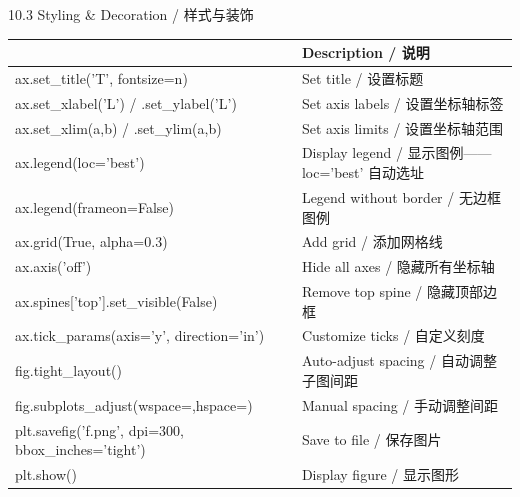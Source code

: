 \documentclass[11pt,a4paper]{report}
\begin{document}
\begin{cmdsection}{10.3  Styling \& Decoration / 样式与装饰}
\normalsize\renewcommand{\arraystretch}{1.4}
\centering
\begin{tabularx}{\textwidth}{@{}>{\ttfamily}l>{\raggedright\arraybackslash}X@{}}
\toprule
\multicolumn{1}{@{}l}{\textbf{Syntax}} & \textbf{Description / 说明} \\ \midrule
ax.set\_title('T', fontsize=n)  & Set title / 设置标题 \\
ax.set\_xlabel('L') / .set\_ylabel('L') & Set axis labels / 设置坐标轴标签 \\
ax.set\_xlim(a,b) / .set\_ylim(a,b) & Set axis limits / 设置坐标轴范围 \\
ax.legend(loc='best')           & Display legend / 显示图例——loc='best' 自动选址 \\
ax.legend(frameon=False)        & Legend without border / 无边框图例 \\
ax.grid(True, alpha=0.3)        & Add grid / 添加网格线 \\
ax.axis('off')                  & Hide all axes / 隐藏所有坐标轴 \\
ax.spines['top'].set\_visible(False) & Remove top spine / 隐藏顶部边框 \\
ax.tick\_params(axis='y', direction='in') & Customize ticks / 自定义刻度 \\
fig.tight\_layout()             & Auto-adjust spacing / 自动调整子图间距 \\
fig.subplots\_adjust(wspace=,hspace=) & Manual spacing / 手动调整间距 \\
plt.savefig('f.png', dpi=300, bbox\_inches='tight') & Save to file / 保存图片 \\
plt.show()                      & Display figure / 显示图形 \\
\bottomrule
\end{tabularx}
\end{cmdsection}
\end{document}

